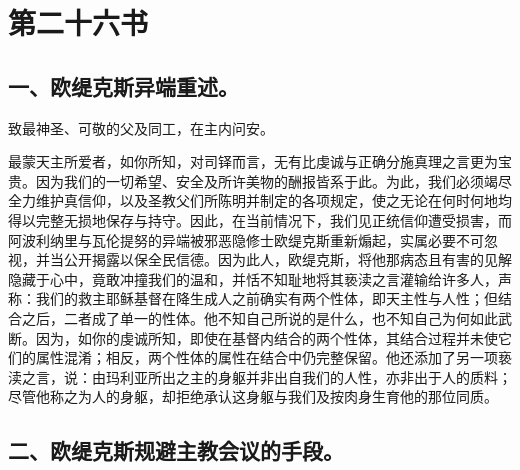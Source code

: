 

\section{第二十六书}

\par


\subsection{一、欧缇克斯异端重述。}

致最神圣、可敬的父及同工，在主内问安。\par

最蒙天主所爱者，如你所知，对司铎而言，无有比虔诚与正确分施真理之言更为宝贵。因为我们的一切希望、安全及所许美物的酬报皆系于此。为此，我们必须竭尽全力维护真信仰，以及圣教父们所陈明并制定的各项规定，使之无论在何时何地均得以完整无损地保存与持守。因此，在当前情况下，我们见正统信仰遭受损害，而阿波利纳里与瓦伦提努的异端被邪恶隐修士欧缇克斯重新煽起，实属必要不可忽视，并当公开揭露以保全民信德。因为此人，欧缇克斯，将他那病态且有害的见解隐藏于心中，竟敢冲撞我们的温和，并恬不知耻地将其亵渎之言灌输给许多人，声称：我们的救主耶稣基督在降生成人之前确实有两个性体，即天主性与人性；但结合之后，二者成了单一的性体。他不知自己所说的是什么，也不知自己为何如此武断。因为，如你的虔诚所知，即使在基督内结合的两个性体，其结合过程并未使它们的属性混淆；相反，两个性体的属性在结合中仍完整保留。他还添加了另一项亵渎之言，说：由玛利亚所出之主的身躯并非出自我们的人性，亦非出于人的质料；尽管他称之为人的身躯，却拒绝承认这身躯与我们及按肉身生育他的那位同质。\par


\subsection{二、欧缇克斯规避主教会议的手段。}

